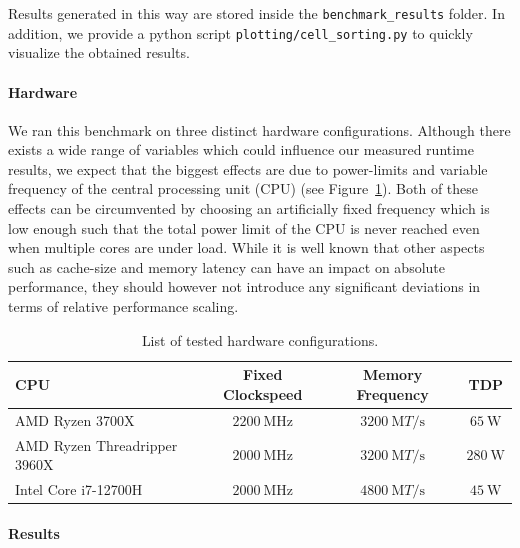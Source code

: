 Results generated in this way are stored inside the \texttt{benchmark\_results} folder.
In addition, we provide a python script \texttt{plotting/cell\_sorting.py} to quickly visualize
the obtained results.

\paragraph{Hardware}
We ran this benchmark on three distinct hardware configurations.
Although there exists a wide range of variables which could influence our measured runtime results,
we expect that the biggest effects are due to power-limits and variable frequency of the
central processing unit (CPU) (see Figure~\ref{tab:hardware-configurations}).
Both of these effects can be circumvented by choosing an artificially fixed frequency which is low
enough such that the total power limit of the CPU is never reached even when multiple cores are
under load.
While it is well known that other aspects such as cache-size and memory latency can have an impact
on absolute performance, they should however not introduce any significant deviations in terms of
relative performance scaling.

\begin{table}
    \centering
    \begin{tabular}{l c c c}
        CPU & Fixed Clockspeed & Memory Frequency & TDP\\
        \hline
        AMD Ryzen 3700X~\cite{AMDProductSpecifications} & $\SI{2200}{\mega\hertz}$
        & $\SI{3200}{\mega T\per\second}$ & $\SI{65}{\watt}$\\
        AMD Ryzen Threadripper 3960X~\cite{AMDProductSpecifications} & $\SI{2000}{\mega\hertz}$
        & $\SI{3200}{\mega T\per\second}$ & $\SI{280}{\watt}$\\
        Intel Core i7-12700H~\cite{Inteli712700H} & $\SI{2000}{\mega\hertz}$
        & $\SI{4800}{\mega T\per\second}$
        & $\SI{45}{\watt}$\\
    \end{tabular}
    \caption{List of tested hardware configurations.}
    \label{tab:hardware-configurations}
\end{table}

\paragraph{Results}


